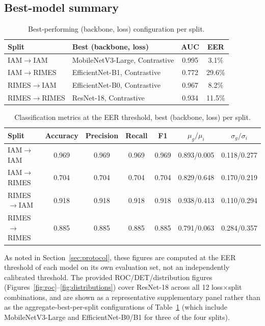 \subsection{Best-model summary}
\label{sec:roc-det}

\begin{table}[htbp]
  \centering
  \caption{Best-performing (backbone, loss) configuration per split.}
  \label{tab:ours-best}
  \small
  \begin{tabular}{llcc}
    \toprule
    Split & Best (backbone, loss) & AUC & EER \\
    \midrule
    IAM$\to$IAM     & MobileNetV3-Large, Contrastive & 0.995 & 3.1\%  \\
    IAM$\to$RIMES   & EfficientNet-B1, Contrastive   & 0.772 & 29.6\% \\
    RIMES$\to$IAM   & EfficientNet-B0, Contrastive   & 0.967 & 8.2\%  \\
    RIMES$\to$RIMES & ResNet-18, Contrastive         & 0.934 & 11.5\% \\
    \bottomrule
  \end{tabular}
\end{table}

\begin{table}[htbp]
  \centering
  \caption{Classification metrics at the EER threshold, best
  (backbone, loss) per split.}
  \label{tab:classification-metrics}
  \small
  \begin{tabular}{lcccccc}
    \toprule
    Split & Accuracy & Precision & Recall & F1 & $\mu_g/\mu_i$ & $\sigma_g/\sigma_i$ \\
    \midrule
    IAM$\to$IAM     & 0.969 & 0.969 & 0.969 & 0.969 & 0.893/0.005 & 0.118/0.277 \\
    IAM$\to$RIMES   & 0.704 & 0.704 & 0.704 & 0.704 & 0.829/0.648 & 0.170/0.219 \\
    RIMES$\to$IAM   & 0.918 & 0.918 & 0.918 & 0.918 & 0.938/0.413 & 0.110/0.294 \\
    RIMES$\to$RIMES & 0.885 & 0.885 & 0.885 & 0.885 & 0.791/0.063 & 0.284/0.357 \\
    \bottomrule
  \end{tabular}
\end{table}

As noted in Section~\ref{sec:protocol}, these figures are computed at
the EER threshold of each model on its own evaluation set, not an
independently calibrated threshold. The provided ROC/DET/distribution
figures (Figures~\ref{fig:roc}--\ref{fig:distributions}) cover
ResNet-18 across all 12 loss$\times$split combinations, and are shown
as a representative supplementary panel rather than as the
aggregate-best-per-split configurations of
Table~\ref{tab:ours-best} (which include MobileNetV3-Large and
EfficientNet-B0/B1 for three of the four splits).

